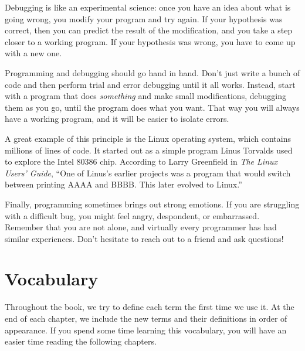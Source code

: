 

Debugging is like an experimental science: once you have an idea about what is going wrong, you modify your program and try again.
If your hypothesis was correct, then you can predict the result of the modification, and you take a step closer to a working program.
If your hypothesis was wrong, you have to come up with a new one.

Programming and debugging should go hand in hand.
Don't just write a bunch of code and then perform trial and error debugging until it all works.
Instead, start with a program that does {\em something} and make small modifications, debugging them as you go, until the program does what you want.
That way you will always have a working program, and it will be easier to isolate errors.


A great example of this principle is the Linux operating system, which contains millions of lines of code.
It started out as a simple program Linus Torvalds used to explore the Intel 80386 chip.
According to Larry Greenfield in {\it The Linux Users' Guide}, ``One of Linus's earlier projects was a program that would switch between printing AAAA and BBBB.
This later evolved to Linux.''


Finally, programming sometimes brings out strong emotions.
If you are struggling with a difficult bug, you might feel angry, despondent, or embarrassed.
Remember that you are not alone, and virtually every programmer has had similar experiences.
Don't hesitate to reach out to a friend and ask questions!



\section{Vocabulary}

Throughout the book, we try to define each term the first time we use it.
At the end of each chapter, we include the new terms and their definitions in order of appearance.
If you spend some time learning this vocabulary, you will have an easier time reading the following chapters.

